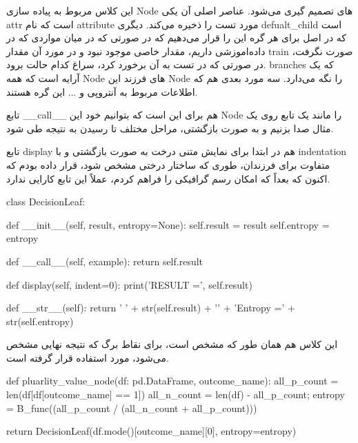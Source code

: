 \documentclass[12pt,titlepage,a4page , tikz , multi,table , svgnames,xcdraw]{article}
\begin{document}
این کلاس مربوط به پیاده سازی Node های تصمیم گیری می‌شود. عناصر اصلی آن یکی attr است که نام attribute مورد تست را ذخیره می‌کند. دیگری defualt\_child است که در اصل برای هر گره این را قرار می‌دهیم که در صورتی که در میان مواردی که در داده‌اموزشی داریم، مقدار خاصی موجود نبود  و در مورد آن مقدار train صورت نگرفت، در صورتی که در تست به آن برخورد کرد، سراغ کدام حالت برود. branches که یک آرایه است که همه Node های فرزند این Node را نگه می‌دارد. سه مورد بعدی هم که اطلاعات مربوط به آنتروپی و ... این گره هستند.

تابع \_\_call\_\_ هم برای این است که بتوانیم خود این Node را مانند یک تابع روی یک مثال صدا بزنیم و به صورت بازگشتی، مراحل مختلف تا رسیدن به نتیجه طی شود.

تابع display هم در ابتدا برای نمایش متنی درخت به صورت بازگشتی و با indentation متفاوت برای فرزندان، طوری که ساختار درختی مشخص شود، قرار داده بودم که اکنون که بعداً که امکان رسم گرافیکی را فراهم کردم، عملاً این تابع کارایی ندارد.


\begin{latin}
\begin{python}[language=Python]
class DecisionLeaf:

    def __init__(self, result, entropy=None):
        self.result = result
        self.entropy = entropy

    def __call__(self, example):
        return self.result

    def display(self, indent=0):
        print('RESULT =', self.result)

    def __str__(self):
        return ' ' + str(self.result) + '\n' +
         'Entropy =' + str(self.entropy)

\end{python}

\end{latin}

این کلاس هم همان طور که مشخص است، برای نقاط برگ که نتیجه نهایی مشخص می‌شود، مورد استفاده قرار گرفته است.



    \begin{latin}
\begin{python}[language=Python]
def pluarlity_value_node(df: pd.DataFrame, outcome_name):
    all_p_count = len(df[df[outcome_name] == 1])
    all_n_count = len(df) - all_p_count;
    entropy = B_func((all_p_count / (all_n_count + all_p_count)))

    return DecisionLeaf(df.mode()[outcome_name][0], entropy=entropy)


\end{python}

\end{latin}
\end{document}
